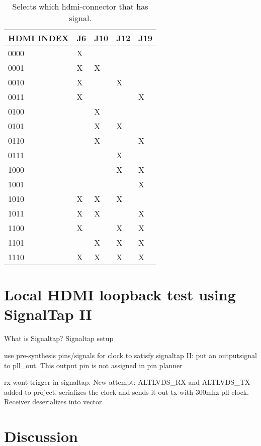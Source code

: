 \documentclass[main.tex]{subfiles}
\begin{document}
\begin{table}[]
\centering
\caption{Selects which hdmi-connector that has signal.}
\label{my-label}
\begin{tabular}{|l|l|l|l|l|}
\hline
HDMI INDEX & J6 & J10 & J12 & J19 \\ \hline
0000       & X  &     &     &     \\ \hline
0001       & X  & X   &     &     \\ \hline
0010       & X  &     & X   &     \\ \hline
0011       & X  &     &     & X   \\ \hline
0100       &    & X   &     &     \\ \hline
0101       &    & X   & X   &     \\ \hline
0110       &    & X   &     & X   \\ \hline
0111       &    &     & X   &     \\ \hline
1000       &    &     & X   & X   \\ \hline
1001       &    &     &     & X   \\ \hline
1010       & X  & X   & X   &     \\ \hline
1011       & X  & X   &     & X   \\ \hline
1100       & X  &     & X   & X   \\ \hline
1101       &    & X   & X   & X   \\ \hline
1110       & X  & X   & X   & X   \\ \hline
\end{tabular}
\end{table}


\section{Local HDMI loopback test using SignalTap II}

What is Signaltap?
Signaltap setup

use pre-synthesis pins/signals for clock
to satisfy signaltap II: put an outputsignal to pll\_out. This output pin is not assigned in pin planner

rx wont trigger in signaltap. New attempt: ALTLVDS\_RX and ALTLVDS\_TX added to project.
serializes the clock and sends it out tx with 300mhz pll clock. Receiver deserializes into vector.

\section{Discussion}
\end{document}
